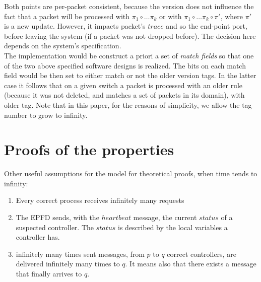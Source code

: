 \documentclass{article}
\theoremstyle{remark}
\begin{document}
Both points are per-packet consistent, because the version does not influence the fact that a packet will be processed with $\pi_1\circ\ldots\pi_k$ or with $\pi_1\circ\ldots\pi_k\circ\pi'$, where $\pi'$ is a new update. However, it impacts packet's $trace$ and so the end-point port, before leaving the system (if a packet was not dropped before). The decision here depends on the system's specification.\\
The implementation would be construct a priori a set of \emph{match fields} so that one of the two above specified software designs is realized. The bits on each match field would be then set to either match or not the older version tags. In the latter case it follows that on a given switch a packet is processed with an older rule (because it was not deleted, and matches a set of packets in its domain), with older tag. Note that in this paper, for the reasons of simplicity, we allow the tag number to grow to infinity. 

\section{Proofs of the properties}
Other useful assumptions for the model for theoretical proofs, when time tends to infinity:
\begin{enumerate}
\item Every correct process receives infinitely many requests
\item The EPFD sends, with the $heartbeat$ message, the current $status$ of a suspected controller. The $status$ is described by the local variables a controller has.
\item infinitely many times sent messages, from $p$ to $q$ correct controllers, are delivered infinitely many times to $q$. It means also that there exists a message that finally arrives to $q$.
\end{enumerate}
\end{document}
